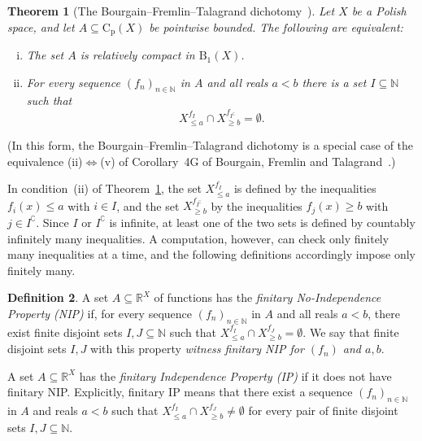 \documentclass[psamsfonts]{amsart}
\newtheorem{thm}{Theorem}[section]
\theoremstyle{definition}
\newtheorem{defn}[thm]{Definition}
\theoremstyle{remark}
\newcommand{\Cp}{\mathrm{C}_{\mathrm{p}}}
\numberwithin{equation}{section}
\begin{document}
\begin{thm}[The Bourgain--Fremlin--Talagrand dichotomy~\cite{BFT_1978_PCompactBaire}]
  \label{thm:BFT}
  Let $X$ be a Polish space, and let $A\subseteq \Cp(X)$ be pointwise bounded.
  The following are equivalent:
  \begin{enumerate}[(i)]
  \item
    The set $A$ is relatively compact in $\mathrm{B}_1(X)$.
  \item
    For every sequence $(f_n)_{n\in\mathbb{N}}$ in $A$ and all reals $a<b$ there is a set $I\subseteq\mathbb{N}$ such that
    \begin{equation*}
    X_{\le a}^{f_I} \cap X_{\ge b}^{f_{I^{\complement}}} = \emptyset.
    \end{equation*}
  \end{enumerate}
\end{thm}
(In this form, the Bourgain--Fremlin--Talagrand dichotomy is a special case of the equivalence (ii)$\Leftrightarrow$(v) of Corollary~4G of Bourgain, Fremlin and Talagrand~\cite{BFT_1978_PCompactBaire}.)

In condition~(ii) of Theorem~\ref{thm:BFT}, the set $X_{\le a}^{f_I}$ is defined by the inequalities $f_i(x)\le a$ with $i\in I$, and the set $X_{\ge b}^{f_{I^{\complement}}}$ by the inequalities $f_j(x)\ge b$ with $j\in I^{\complement}$.
Since $I$ or $I^{\complement}$ is infinite, at least one of the two sets is defined by countably infinitely many inequalities.
A computation, however, can check only finitely many inequalities at a time, and the following definitions accordingly impose only finitely many.

\begin{defn}\label{def:NIP-fns}
  A set $A\subseteq \mathbb{R}^X$ of functions has the \emph{finitary No-Independence Property (NIP)} if, for every sequence $(f_n)_{n\in\mathbb{N}}$ in $A$ and all reals $a<b$, there exist finite disjoint sets $I,J\subseteq\mathbb{N}$ such that $X_{\le a}^{f_I} \cap X_{\ge b}^{f_J} = \emptyset$.
  We say that finite disjoint sets $I, J$ with this property \emph{witness finitary NIP for $(f_n)$ and $a, b$}.

  A set $A\subseteq \mathbb{R}^X$ has the \emph{finitary Independence Property (IP)} if it does not have finitary NIP.
  Explicitly, finitary IP means that there exist a sequence $(f_n)_{n\in\mathbb{N}}$ in $A$ and reals $a<b$ such that $X_{\le a}^{f_I} \cap X_{\ge b}^{f_J} \ne \emptyset$ for every pair of finite disjoint sets $I,J\subseteq\mathbb{N}$.
\end{defn}
\end{document}
